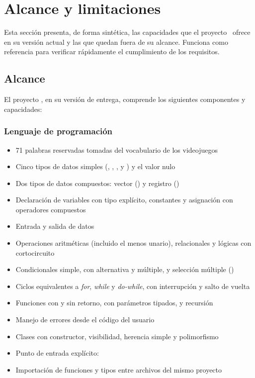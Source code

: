 \newpage
\section{Alcance y limitaciones}

Esta sección presenta, de forma sintética, las capacidades que el proyecto \ggez\ ofrece en su versión actual y las que quedan fuera de su alcance. Funciona como referencia para verificar rápidamente el cumplimiento de los requisitos.

\subsection{Alcance}
\label{sec:alcance}

El proyecto \ggez, en su versión de entrega, comprende los siguientes componentes y capacidades:

\subsubsection*{Lenguaje de programación}
\begin{itemize}
  \item 71 palabras reservadas tomadas del vocabulario de los videojuegos
  \item Cinco tipos de datos simples (, , ,  y ) y el valor nulo 
  \item Dos tipos de datos compuestos: vector () y registro ()
  \item Declaración de variables con tipo explícito, constantes y asignación con operadores compuestos
  \item Entrada y salida de datos
  \item Operaciones aritméticas (incluido el menos unario), relacionales y lógicas con cortocircuito
  \item Condicionales simple, con alternativa y múltiple, y selección múltiple ()
  \item Ciclos equivalentes a \emph{for}, \emph{while} y \emph{do-while}, con interrupción y salto de vuelta
  \item Funciones con y sin retorno, con parámetros tipados, y recursión
  \item Manejo de errores desde el código del usuario
  \item Clases con constructor, visibilidad, herencia simple y polimorfismo
  \item Punto de entrada explícito: 
  \item Importación de funciones y tipos entre archivos del mismo proyecto
\end{itemize}

